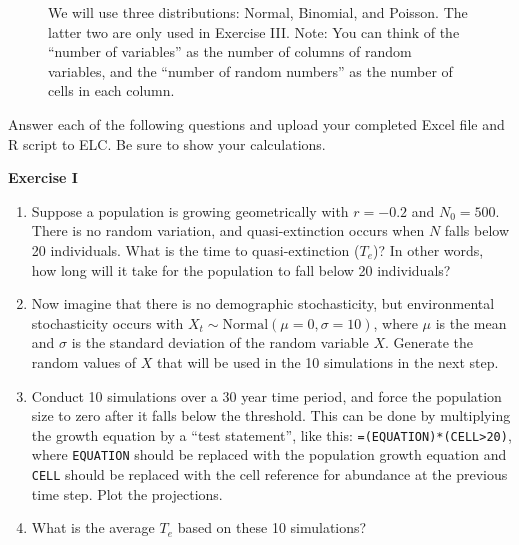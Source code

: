 \documentclass[12pt]{article}\usepackage[]{graphicx}\usepackage[]{color}
\begin{document}
\vspace{1cm}

\begin{figure}[h]
  \centering
  \caption{\footnotesize We will use three distributions: Normal,
    Binomial, and Poisson. The latter two are only used in Exercise
    III. Note: You can think of the ``number of variables'' as the
    number of columns of random variables, and the ``number of random
    numbers'' as the number of cells in each column.
  }
  \label{fig:rng-3}
\end{figure}


\clearpage

Answer each of the following questions and upload your completed Excel
file and R script to ELC. Be sure to show your calculations. \\

\vspace{12pt}

{\bf Exercise I \\}
\begin{enumerate}
  \item Suppose a population is growing geometrically with
    $r=-0.2$ and $N_0=500$. There is no random variation, and
    quasi-extinction occurs when $N$ falls below 20 individuals.
    What is the time to quasi-extinction ($T_e$)? In other words, how
    long will it take for the population to fall below 20 individuals?
  \item Now imagine that there is no demographic stochasticity,
    but environmental stochasticity occurs with $X_t \sim
    \mathrm{Normal}(\mu=0, \sigma=10)$, where $\mu$ is the mean
    and $\sigma$ is the standard deviation of the random variable
    $X$. Generate the random values of $X$ that will be
    used in the 10 simulations in the next step.
  \item Conduct 10 simulations over a 30 year time period, and force
    the population size to zero after it falls below the threshold.
    This can be done by multiplying the
    growth equation by a ``test statement'', like this:
    {\tt =(EQUATION)*(CELL>20)}, where {\tt EQUATION} should be
    replaced with the population growth equation and {\tt CELL} should
    be replaced with the cell reference for abundance at the previous
    time step. Plot the projections.
  \item What is the average $T_e$ based on these 10 simulations?
\end{enumerate}
\end{document}
